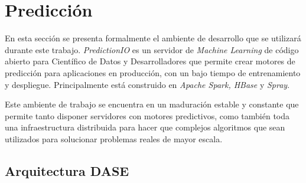 

\section{Predicción }

  	
En esta sección se presenta formalmente el ambiente de desarrollo que se utilizará durante este trabajo. \emph{PredictionIO} es un servidor de \emph{Machine Learning} de código abierto para Científico de Datos y Desarrolladores que permite crear motores de predicción para aplicaciones en producción, con un bajo tiempo de entrenamiento y despliegue. Principalmente está construido en \emph{Apache Spark, HBase} y \emph{Spray}. 

Este ambiente de trabajo se encuentra en un maduración estable y constante que permite tanto disponer servidores con motores predictivos, como también toda una infraestructura distribuida para hacer que complejos algoritmos que sean utilizados para solucionar problemas reales de mayor escala.














 
 



\subsection{Arquitectura DASE}


